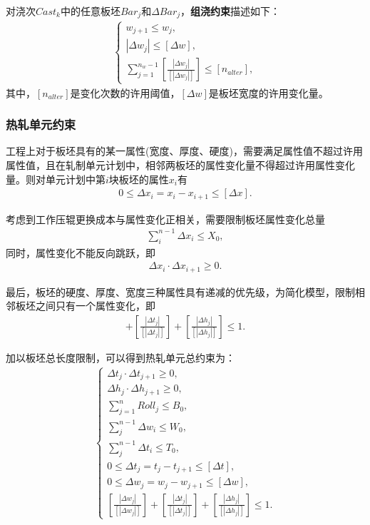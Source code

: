 \documentclass{whutmod}
\begin{document}
		对浇次$Cast_k$中的任意板坯$Bar_j$和$\Delta Bar_j$，\textbf{组浇约束}描述如下：
		\begin{gather}
		\left\{\begin{matrix}
		w_{j+1}\leq w_{j},
		\\ |\Delta w_j|\leq [\Delta w],
		\\\sum_{j=1}^{n_{w}-1}[\frac{|\Delta w_j|}{[|\Delta w_j|]}]\leq [n_{alter}],
		\end{matrix}\right.
		\end{gather}
		其中，$[n_{alter}]$是变化次数的许用阈值，$[\Delta w]$是板坯宽度的许用变化量。
		\subsubsection{热轧单元约束}

		工程上对于板坯具有的某一属性(宽度、厚度、硬度)，需要满足属性值不超过许用属性值，且在轧制单元计划中，相邻两板坯的属性变化量不得超过许用属性变化量。则对单元计划中第$i$块板坯的属性$x_i$有
		\begin{gather}
		0\leq \Delta x_i=x_i-x_{i+1}\leq [\Delta x].
		\end{gather}
		
		考虑到工作压辊更换成本与属性变化正相关，需要限制板坯属性变化总量
		\begin{gather*}
		\sum_{i}^{n-1}\Delta x_i\leq X_0,
		\end{gather*}
		同时，属性变化不能反向跳跃，即
		\begin{gather*}
		\Delta x_i\cdot \Delta x_{i+1}\geq 0.
		\end{gather*}
		
		最后，板坯的硬度、厚度、宽度三种属性具有递减的优先级，为简化模型，限制相邻板坯之间只有一个属性变化，即
		\begin{gather}
		[\frac{|\Delta w_j|}{[|\Delta w_j|]}]+[\frac{|\Delta t_j|}{[|\Delta t_j|]}]+[\frac{|\Delta h_j|}{[|\Delta h_j|]}]\leq 1.
		\end{gather}
		
		加以板坯总长度限制，可以得到热轧单元总约束为：
		\begin{gather}
		\left\{\begin{matrix}
		\Delta t_j\cdot \Delta t_{j+1}\geq 0,
		\\\Delta h_j\cdot \Delta h_{j+1}\geq 0, 
		\\\textstyle \sum_{j=1}^{n}Roll_{j}\leq B_0,
		\\ \textstyle\sum_{j}^{n-1}\Delta w_i\leq W_0,
		\\\textstyle\sum_{j}^{n-1}\Delta t_i\leq T_0,  
		\\0\leq\Delta t_j=t_{j}-t_{j+1}\leq [\Delta t],
		\\0\leq\Delta w_j=w_{j}-w_{j+1}\leq [\Delta w],
		\\ [\frac{|\Delta w_j|}{[|\Delta w_j|]}]+[\frac{|\Delta t_j|}{[|\Delta t_j|]}]+[\frac{|\Delta h_j|}{[|\Delta h_j|]}]\leq 1.
		\end{matrix}\right.
		\end{gather}
\end{document}
